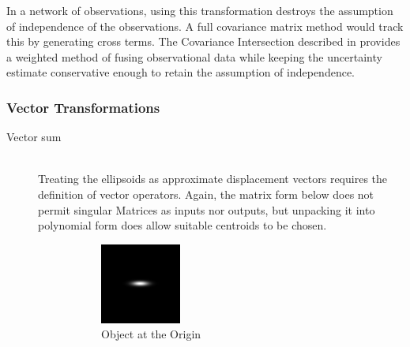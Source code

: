\documentclass[a4paper, 11pt, titlepage]{article}
\begin{document}
      In a network of observations, using this transformation destroys the assumption of independence of the observations.  A full covariance matrix method would track this by generating cross terms.  The Covariance Intersection described in \cite{CovarNoCorrel} provides a weighted method of fusing observational data while keeping the uncertainty estimate conservative enough to retain the assumption of independence.

    \subsubsection{Vector Transformations}
    \begin{description}

      \item[Vector sum] \hfill \\
        Treating the ellipsoids as approximate displacement vectors requires the definition of vector operators.
        Again, the matrix form below does not permit singular Matrices as inputs nor outputs, but unpacking it into polynomial form does allow suitable centroids to be chosen.
      \begin{figure}
      \centering
      \begin{subfigure}{.3\textwidth}
        \centering
        \includegraphics[width=.8\linewidth]{images/GaussianSum1.png}
        \caption{Object at the Origin}
        \label{fig:vectSumsub1}
      \end{subfigure}%
      \begin{subfigure}{.3\textwidth}

\end{subfigure}
\end{figure}
\end{description}
\end{document}

